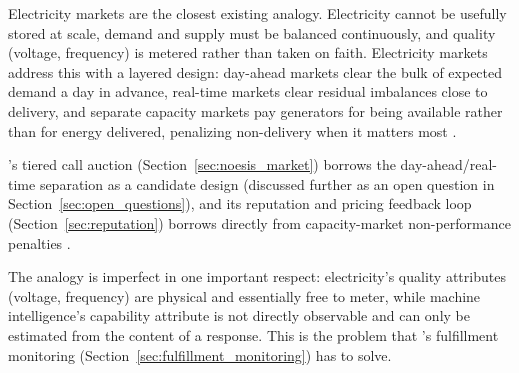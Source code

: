 Electricity markets are the closest existing analogy. Electricity cannot be
usefully stored at scale, demand and supply must be balanced continuously, and
quality (voltage, frequency) is metered rather than taken on faith. Electricity
markets address this with a layered design: day-ahead markets clear the bulk of
expected demand a day in advance, real-time markets clear residual imbalances
close to delivery, and separate capacity markets pay generators for being
available rather than for energy delivered, penalizing non-delivery when it
matters most \cite{stoft2002, cramton2017}.

\Noesis{}'s tiered call auction (Section~\ref{sec:noesis_market}) borrows the
day-ahead/real-time separation as a candidate design (discussed further as an
open question in Section~\ref{sec:open_questions}), and its reputation and
pricing feedback loop (Section~\ref{sec:reputation}) borrows directly from
capacity-market non-performance penalties \cite{cramtonstoft2005}.

The analogy is imperfect in one important respect: electricity's quality
attributes (voltage, frequency) are physical and essentially free to meter,
while machine intelligence's capability attribute is not directly observable
and can only be estimated from the content of a response. This is the problem
that \NoesisServer{}'s fulfillment monitoring
(Section~\ref{sec:fulfillment_monitoring}) has to solve.
